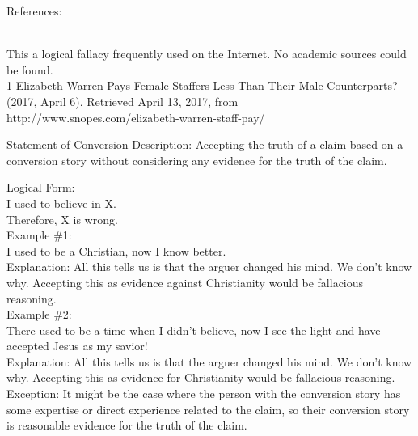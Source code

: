 \documentclass[a4paper,12pt,single,pdftex]{scrbook}
\begin{document}
    References:

    
      
        
      \\

      
        This a logical fallacy frequently used on the Internet. No academic sources could be found.
      \\

      
        
          1 Elizabeth Warren Pays Female Staffers Less Than Their Male Counterparts? (2017, April 6). Retrieved April 13, 2017, from http://www.snopes.com/elizabeth-warren-staff-pay/
        
      
    
  

Statement of Conversion
    Description:  Accepting the truth of a claim based on a conversion story without considering any evidence for the truth of the claim.

    
      Logical Form:
    \\

    
      I used to believe in X.
    \\

    
      Therefore, X is wrong.
    \\

    
      Example \#1:
    \\

    
      I used to be a Christian, now I know better.
    \\

    
      Explanation: All this tells us is that the arguer changed his mind.  We don’t know why. Accepting this as evidence against Christianity would be fallacious reasoning.
    \\

    
      Example \#2:
    \\

    
      There used to be a time when I didn’t believe, now I see the light and have accepted Jesus as my savior!
    \\

    
      Explanation: All this tells us is that the arguer changed his mind.  We don’t know why.  Accepting this as evidence for Christianity would be fallacious reasoning.
    \\

    
      Exception: It might be the case where the person with the conversion story has some expertise or direct experience related to the claim, so their conversion story is reasonable evidence for the truth of the claim. \newline
\end{document}
